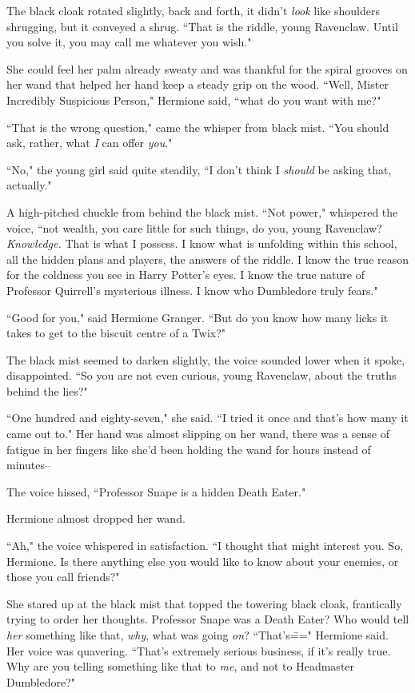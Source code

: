 The black cloak rotated slightly, back and forth, it didn't \emph{look} like shoulders shrugging, but it conveyed a shrug. ``That is the riddle, young Ravenclaw. Until you solve it, you may call me whatever you wish."

She could feel her palm already sweaty and was thankful for the spiral grooves on her wand that helped her hand keep a steady grip on the wood. ``Well, Mister Incredibly Suspicious Person," Hermione said, ``what do you want with me?"

``That is the wrong question," came the whisper from black mist. ``You should ask, rather, what \emph{I} can offer \emph{you}."

``No," the young girl said quite steadily, ``I don't think I \emph{should} be asking that, actually."

A high-pitched chuckle from behind the black mist. ``Not power," whispered the voice, ``not wealth, you care little for such things, do you, young Ravenclaw? \emph{Knowledge.} That is what I possess. I know what is unfolding within this school, all the hidden plans and players, the answers of the riddle. I know the true reason for the coldness you see in Harry Potter's eyes. I know the true nature of Professor Quirrell's mysterious illness. I know who Dumbledore truly fears."

``Good for you," said Hermione Granger. ``But do you know how many licks it takes to get to the biscuit centre of a Twix?"

The black mist seemed to darken slightly, the voice sounded lower when it spoke, disappointed. ``So you are not even curious, young Ravenclaw, about the truths behind the lies?"

``One hundred and eighty-seven," she said. ``I tried it once and that's how many it came out to." Her hand was almost slipping on her wand, there was a sense of fatigue in her fingers like she'd been holding the wand for hours instead of minutes\---

The voice hissed, ``Professor Snape is a hidden Death Eater."

Hermione almost dropped her wand.

``Ah," the voice whispered in satisfaction. ``I thought that might interest you. So, Hermione. Is there anything else you would like to know about your enemies, or those you call friends?"

She stared up at the black mist that topped the towering black cloak, frantically trying to order her thoughts. Professor Snape was a Death Eater? Who would tell \emph{her} something like that, \emph{why}, what was going \emph{on}? ``That's\===" Hermione said. Her voice was quavering. ``That's extremely serious business, if it's really true. Why are you telling something like that to \emph{me}, and not to Headmaster Dumbledore?"

